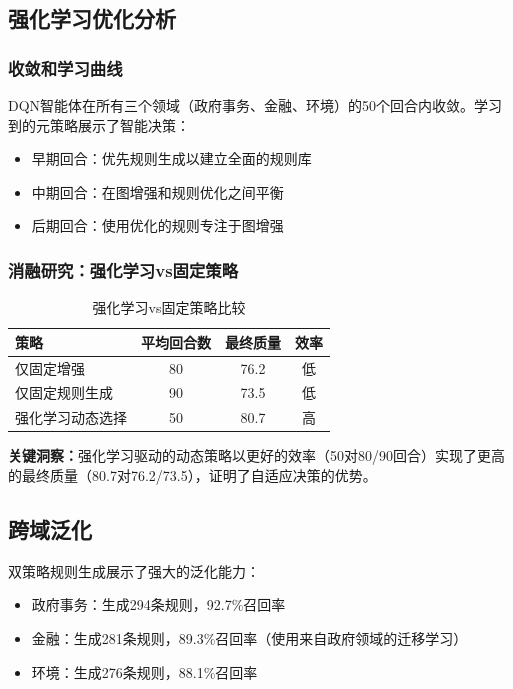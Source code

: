 \documentclass[runningheads]{llncs}
\begin{document}
\subsection{强化学习优化分析}

\subsubsection{收敛和学习曲线}
DQN智能体在所有三个领域（政府事务、金融、环境）的50个回合内收敛。学习到的元策略展示了智能决策：
\begin{itemize}
    \item 早期回合：优先规则生成以建立全面的规则库
    \item 中期回合：在图增强和规则优化之间平衡
    \item 后期回合：使用优化的规则专注于图增强
\end{itemize}

\subsubsection{消融研究：强化学习vs固定策略}
\begin{table}[H]
    \centering
    \caption{强化学习vs固定策略比较}
    \label{tab:rl_ablation}
    \begin{tabular}{l c c c}
    \toprule
    策略 & 平均回合数 & 最终质量 & 效率 \\
    \midrule
    仅固定增强 & 80 & 76.2 & 低 \\
    仅固定规则生成 & 90 & 73.5 & 低 \\
    强化学习动态选择 & 50 & 80.7 & 高 \\
    \bottomrule
    \end{tabular}
\end{table}

\textbf{关键洞察：}强化学习驱动的动态策略以更好的效率（50对80/90回合）实现了更高的最终质量（80.7对76.2/73.5），证明了自适应决策的优势。

\subsection{跨域泛化}
双策略规则生成展示了强大的泛化能力：
\begin{itemize}
    \item 政府事务：生成294条规则，92.7\%召回率
    \item 金融：生成281条规则，89.3\%召回率（使用来自政府领域的迁移学习）
    \item 环境：生成276条规则，88.1\%召回率
\end{itemize}
\end{document}
